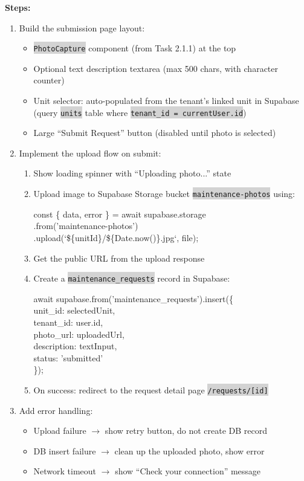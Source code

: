 \documentclass[11pt, a4paper]{article}
\newcommand{\code}[1]{\texttt{\small\colorbox{lightgray}{#1}}}
\begin{document}
\textbf{Steps:}
\begin{enumerate}[leftmargin=2em, itemsep=2pt]
  \item Build the submission page layout:
    \begin{itemize}[itemsep=1pt]
      \item \code{PhotoCapture} component (from Task 2.1.1) at the top
      \item Optional text description textarea (max 500 chars, with character counter)
      \item Unit selector: auto-populated from the tenant's linked unit in Supabase (query \code{units} table where \code{tenant\_id = currentUser.id})
      \item Large ``Submit Request'' button (disabled until photo is selected)
    \end{itemize}
  \item Implement the upload flow on submit:
    \begin{enumerate}[itemsep=1pt]
      \item Show loading spinner with ``Uploading photo...'' state
      \item Upload image to Supabase Storage bucket \code{maintenance-photos} using:
      \begin{codebox}
const \{ data, error \} = await supabase.storage\\
\quad .from('maintenance-photos')\\
\quad .upload(`\$\{unitId\}/\$\{Date.now()\}.jpg`, file);
      \end{codebox}
      \item Get the public URL from the upload response
      \item Create a \code{maintenance\_requests} record in Supabase:
      \begin{codebox}
await supabase.from('maintenance\_requests').insert(\{\\
\quad unit\_id: selectedUnit,\\
\quad tenant\_id: user.id,\\
\quad photo\_url: uploadedUrl,\\
\quad description: textInput,\\
\quad status: 'submitted'\\
\});
      \end{codebox}
      \item On success: redirect to the request detail page \code{/requests/[id]}
    \end{enumerate}
  \item Add error handling:
    \begin{itemize}[itemsep=1pt]
      \item Upload failure $\rightarrow$ show retry button, do not create DB record
      \item DB insert failure $\rightarrow$ clean up the uploaded photo, show error
      \item Network timeout $\rightarrow$ show ``Check your connection'' message
    \end{itemize}
\end{enumerate}
\end{document}
